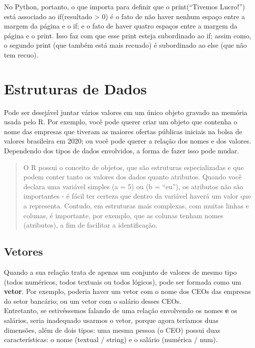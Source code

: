 \documentclass[
]{book}
\begin{document}
No Python, portanto, o que importa para definir que o print(``Tivemos Lucro!'') está associado ao if(resultado \textgreater{} 0) é o fato de não haver nenhum espaço entre a margem da página e o if; e o fato de haver quatro espaços entre a margem da página e o print. Isso faz com que esse print esteja subordinado ao if; assim como, o segundo print (que também está mais recuado) é subordinado ao else (que não tem recuo).

\hypertarget{estruturas-de-dados}{%
\chapter{Estruturas de Dados}\label{estruturas-de-dados}}

Pode ser desejável juntar vários valores em um único objeto gravado na memória usada pelo R. Por exemplo, você pode querer criar um objeto que contenha o nome das empresas que tiveram as maiores ofertas públicas iniciais na bolsa de valores brasileira em 2020; ou você pode querer a relação dos nomes e dos valores. Dependendo dos tipos de dados envolvidos, a forma de fazer isso pode mudar.

\begin{quote}
O R possui o conceito de objetos, que são estruturas especializadas e que podem conter tanto os valores dos dados quanto atributos. Quando você declara uma variável simples (a = 5) ou (b = ``eu''), os atributos não são importantes - é fácil ter certeza que dentro da variável haverá um valor que a representa. Contudo, em estruturas mais complexas, com muitas linhas e colunas, é importante, por exemplo, que as colunas tenham nomes (atributos), a fim de facilitar a identificação.
\end{quote}

\hypertarget{vetores}{%
\section{Vetores}\label{vetores}}

Quando a sua relação trata de apenas um conjunto de valores de mesmo tipo (todos numéricos, todos textuais ou todos lógicos), pode ser formada como um \textbf{vetor}. Por exemplo, poderia haver um vetor com o nome dos CEOs das empresas do setor bancário; ou um vetor com o salário desses CEOs.\\
Entretanto, se estivéssemos falando de uma relação envolvendo os nomes \textbf{e} os salários, seria inadequado usarmos o vetor, porque agora teríamos duas dimensões, além de dois tipos: uma mesma pessoa (o CEO) possui duas características: o nome (textual / string) e o salário (numérica / num).
\end{document}
